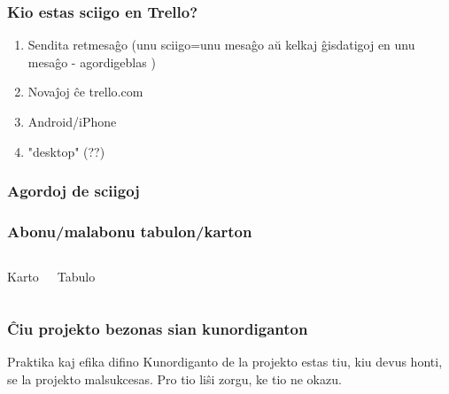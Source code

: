 \documentclass{beamer}
\begin{document}
  \begin{frame}
    \frametitle{Kio estas sciigo en Trello?}

	\begin{enumerate}
		\item Sendita retmesaĝo (unu sciigo=unu mesaĝo aŭ kelkaj ĝisdatigoj en unu mesaĝo - \alert{agordigeblas} )
		\item Novaĵoj ĉe trello.com
		\item Android/iPhone
		\item "desktop" (??)
	\end{enumerate}
  \end{frame}



  \begin{frame}
    \frametitle{Agordoj de sciigoj}

  \end{frame}


  \begin{frame}
    \frametitle{Abonu/malabonu tabulon/karton}

	\begin{columns}
	    \begin{block}{Karto}
	     
    	\end{block}
    	\begin{block}{Tabulo}
    	
    	\end{block}

	\end{columns}
  \end{frame}



  \begin{frame}
    \frametitle{Ĉiu projekto bezonas sian kunordiganton}

	\begin{block}{Praktika kaj efika difino}
		Kunordiganto de la projekto estas tiu, kiu devus honti, se la projekto malsukcesas. Pro tio liŝi zorgu, ke tio ne okazu.
	\end{block}
	    
  \end{frame}
\end{document}
